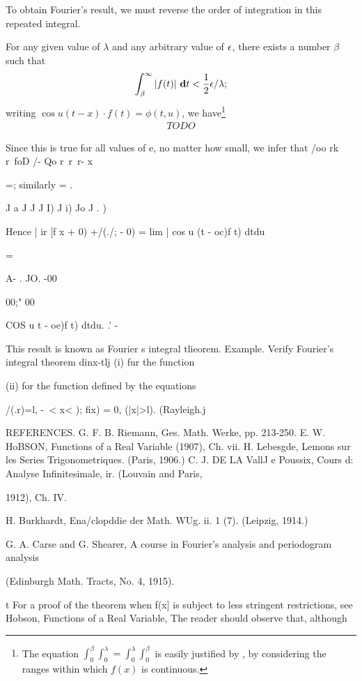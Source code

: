 To obtain Fourier's result, we must reverse the order of integration
in this repeated integral.

For any given value of $\lambda$ and any arbitrary value of $\epsilon$, there exists a
number $\beta$ such that
$$
\int_{\beta}^{\infty}
\left| f(t) \right|
\, \mathbf{d} t
<
\frac{1}{2} \epsilon / \lambda;
$$
%
%
writing $\cos u(t-x) \cdot f(t) = \phi(t,u)$, we
have\footnote{The equation
  $\int_{0}^{\beta} \int_{0}^{\lambda} = \int_{0}^{\lambda} \int_{0}^{\beta}$
  is easily justified by , by considering the ranges within
  which $f(x)$ is continuous.}
\begin{align*}
  TODO
\end{align*}

Since this is true for all values of e, no matter how small, we infer
that /oo rk r\ foD /- Qo r\ r\ r- x

=; similarly = .

J a J J J I) J i) Jo J . )

Hence | ir [f x + 0) +/(./; - 0) = lim | cos u (t - oc)f t) dtdu

=

A- . JO. -00

00;" 00

COS u t - oe)f t) dtdu. .' -

This result is known as Fourier s integral tlieorem. Example. Verify
Fourier's integral theorem dinx-tlj (i) fur the function

(ii) for the function defined by the equations

/(.r)=l, -\ < x< ); fix) = 0, (|x|>l). (Rayleigh.j

REFERENCES. G. F. B. Riemann, Ges. Math. Werke, pp. 213-250. E. W.
HoBSON, Functions of a Real Variable (1907), Ch. vii. H. Lebesgde,
Lemons sur les Series Trigonometriques. (Paris, 1906.) C. J. DE LA
VallJ e Poussix, Cours d: Analyse Infinitesimale, ir. (Louvain and
Paris,

1912), Ch. IV.

H. Burkhardt, Ena/clopddie der Math. WUg. ii. 1 (7). (Leipzig, 1914.)

G. A. Carse and G. Shearer, A course in Fourier's analysis and
periodogram analysis

(Edinburgh Math. Tracts, No. 4, 1915).

t For a proof of the theorem when f(x] is subject to less stringent
restrictions, see Hobson, Functions of a Real Variable, %
The reader should observe that, although

